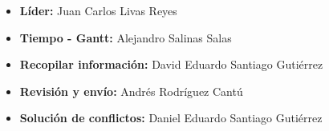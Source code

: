 \begin{itemize}
    \item \textbf{Líder:} Juan Carlos Livas Reyes
    \item \textbf{Tiempo - Gantt:} Alejandro Salinas Salas
    \item \textbf{Recopilar información:} David Eduardo Santiago Gutiérrez
    \item \textbf{Revisión y envío:} Andrés Rodríguez Cantú
    \item \textbf{Solución de conflictos:} Daniel Eduardo Santiago Gutiérrez
\end{itemize}
